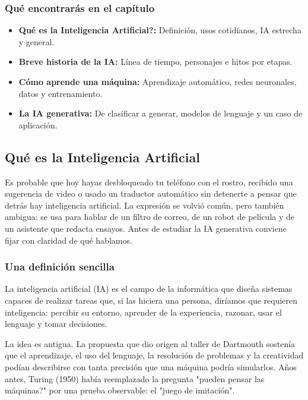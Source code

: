 \subsubsection*{Qué encontrarás en el capítulo}
\begin{itemize}
    \item \textbf{\textquestiondown Qué es la Inteligencia Artificial?:} Definición, usos cotidianos, IA estrecha y general.
    \item \textbf{Breve historia de la IA:} Línea de tiempo, personajes e hitos por etapas.
    \item \textbf{Cómo aprende una máquina:} Aprendizaje automático, redes neuronales, datos y entrenamiento.
    \item \textbf{La IA generativa:} De clasificar a generar, modelos de lenguaje y un caso de aplicación.
\end{itemize}

\vspace{0.3cm}

\subsection{Qué es la Inteligencia Artificial}

Es probable que hoy hayas desbloqueado tu teléfono con el rostro, recibido una sugerencia de video o usado un traductor automático sin detenerte a pensar que detrás hay inteligencia artificial. La expresión se volvió común, pero también ambigua: se usa para hablar de un filtro de correo, de un robot de película y de un asistente que redacta ensayos. Antes de estudiar la IA generativa conviene fijar con claridad de qué hablamos.

\subsubsection{Una definición sencilla}
La inteligencia artificial (IA) es el campo de la informática que diseña sistemas capaces de realizar tareas que, si las hiciera una persona, diríamos que requieren inteligencia: percibir su entorno, aprender de la experiencia, razonar, usar el lenguaje y tomar decisiones. 

La idea es antigua. La propuesta que dio origen al taller de Dartmouth sostenía que el aprendizaje, el uso del lenguaje, la resolución de problemas y la creatividad podían describirse con tanta precisión que una máquina podría simularlos. Años antes, Turing (1950) había reemplazado la pregunta "\textquestiondown pueden pensar las máquinas?" por una prueba observable: el "juego de imitación".

